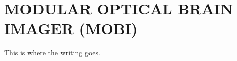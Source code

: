 
\chapter{MODULAR OPTICAL BRAIN IMAGER (MOBI)} %
\label{chap:mobi}
This is where the writing goes. 


